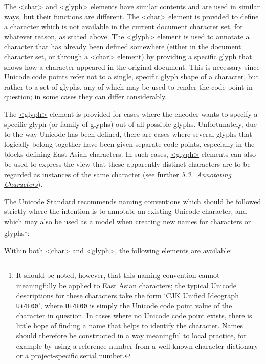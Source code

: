\par
The \hyperref[TEI.char]{<char>} and \hyperref[TEI.glyph]{<glyph>} elements have similar contents and are used in similar ways, but their functions are different. The \hyperref[TEI.char]{<char>} element is provided to define a character which is not available in the current document character set, for whatever reason, as stated above. The \hyperref[TEI.glyph]{<glyph>} element is used to annotate a character that has already been defined somewhere (either in the document character set, or through a \hyperref[TEI.char]{<char>} element) by providing a specific glyph that shows how a character appeared in the original document. This is necessary since Unicode code points refer not to a single, specific glyph shape of a character, but rather to a set of glyphs, any of which may be used to render the code point in question; in some cases they can differ considerably.\par
The \hyperref[TEI.glyph]{<glyph>} element is provided for cases where the encoder wants to specify a specific glyph (or family of glyphs) out of all possible glyphs. Unfortunately, due to the way Unicode has been defined, there are cases where several glyphs that logically belong together have been given separate code points, especially in the blocks defining East Asian characters. In such cases, \hyperref[TEI.glyph]{<glyph>} elements can also be used to express the view that these apparently distinct characters are to be regarded as instances of the same character (see further \textit{\hyperref[D25-30]{5.3.\ Annotating Characters}}).\par
The Unicode Standard recommends naming conventions which should be followed strictly where the intention is to annotate an existing Unicode character, and which may also be used as a model when creating new names for characters or glyphs\footnote{It should be noted, however, that this naming convention cannot meaningfully be applied to East Asian characters; the typical Unicode descriptions for these characters take the form ‘CJK Unified Ideograph \texttt{U+4E00}’, where \texttt{U+4E00} is simply the Unicode code point value of the character in question. In cases where no Unicode code point exists, there is little hope of finding a name that helps to identify the character. Names should therefore be constructed in a way meaningful to local practice, for example by using a reference number from a well-known character dictionary or a project-specific serial number.}:\par
Within both \hyperref[TEI.char]{<char>} and \hyperref[TEI.glyph]{<glyph>}, the following elements are available: 
